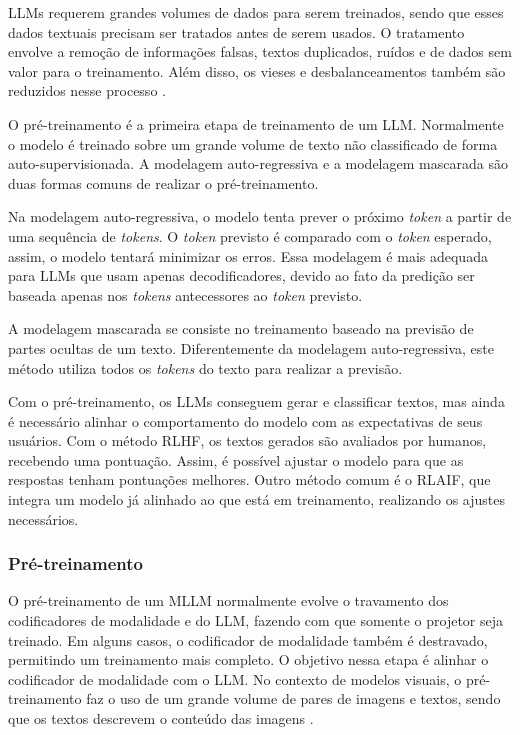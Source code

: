 \acp{LLM} requerem grandes volumes de dados para serem treinados, sendo que esses dados textuais precisam ser tratados antes de serem usados. O tratamento envolve a
remoção de informações falsas, textos duplicados, ruídos e de dados sem valor para o treinamento. Além disso, os vieses e desbalanceamentos também são reduzidos nesse
processo \cite{llm_survey_2024}.


O pré-treinamento é a primeira etapa de treinamento de um \ac{LLM}. Normalmente o modelo é treinado sobre um grande volume de texto não classificado de forma
auto-supervisionada. A modelagem auto-regressiva e a modelagem mascarada são duas formas comuns de realizar o pré-treinamento.

Na modelagem auto-regressiva, o modelo tenta prever o próximo \textit{token} a partir de uma sequência de \textit{tokens}. O \textit{token} previsto é comparado com o
\textit{token} esperado, assim, o modelo tentará minimizar os erros. Essa modelagem é mais adequada para \acp{LLM} que usam apenas decodificadores, devido ao fato da
predição ser baseada apenas nos \textit{tokens} antecessores ao \textit{token} previsto.

A modelagem mascarada se consiste no treinamento baseado na previsão de partes ocultas de um texto. Diferentemente da modelagem auto-regressiva, este método utiliza
todos os \textit{tokens} do texto para realizar a previsão.

 \label{sec:alinhamento}

Com o pré-treinamento, os \acp{LLM} conseguem gerar e classificar textos, mas ainda é necessário alinhar o comportamento do modelo com as expectativas de seus usuários.
Com o método \ac{RLHF}, os textos gerados são avaliados por humanos, recebendo uma pontuação. Assim, é possível ajustar o modelo para que as respostas tenham
pontuações melhores. Outro método comum é o \ac{RLAIF}, que integra um modelo já alinhado ao que está em treinamento, realizando os ajustes necessários.

\subsubsection{Pré-treinamento}

O pré-treinamento de um \ac{MLLM} normalmente evolve o travamento dos codificadores de modalidade e do \ac{LLM}, fazendo com que somente o projetor seja treinado. Em
alguns casos, o codificador de modalidade também é destravado, permitindo um treinamento mais completo. O objetivo nessa etapa é alinhar o codificador de modalidade com o
\ac{LLM}. No contexto de modelos visuais, o pré-treinamento faz o uso de um grande volume de pares de imagens e textos, sendo que os textos descrevem o conteúdo das
imagens \cite{mllm_survey_2023}.

